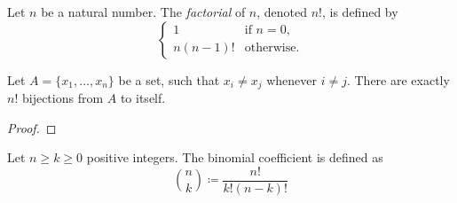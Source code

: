 \begin{definition} 
    Let $n$ be a natural number. The \emph{factorial} of $n$, denoted $n!$, is defined by
    \begin{equation*}
        \begin{cases}
            1 & \text{if } n = 0, \\
            n(n-1)! & \text{otherwise}.
        \end{cases}
    \end{equation*}
\end{definition}
\begin{proposition}
    Let $A = \{x_1, \ldots, x_n \}$ be a set, such that $x_i \neq x_j$ whenever $i \neq j$. There are exactly $n!$ bijections from $A$ to itself.
\end{proposition}
\begin{proof}
\end{proof}
\begin{definition}
    Let $n \geq k \geq 0$ positive integers. The binomial coefficient is defined as
    \begin{equation}
        \binom{n}{k} \coloneqq \frac{n!}{k!(n-k)!}
    \end{equation}  
\end{definition}